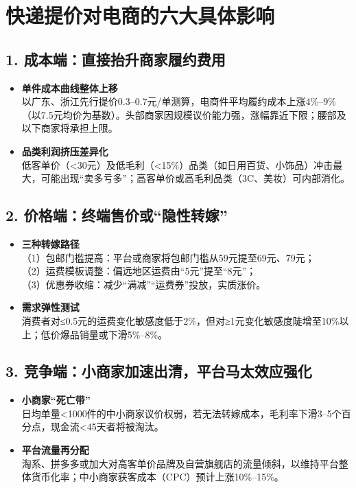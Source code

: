 \section{快递提价对电商的六大具体影响}

\subsection{1. 成本端：直接抬升商家履约费用}
\begin{itemize}
  \item \textbf{单件成本曲线整体上移}  \\
  以广东、浙江先行提价0.3–0.7元/单测算，电商件平均履约成本上涨4\%–9\%（以7.5元均价为基数）。头部商家因规模议价能力强，涨幅靠近下限；腰部及以下商家将承担上限。
  \item \textbf{品类利润挤压差异化}  \\
  低客单价（<30元）及低毛利（<15\%）品类（如日用百货、小饰品）冲击最大，可能出现“卖多亏多”；高客单价或高毛利品类（3C、美妆）可内部消化。
\end{itemize}

\subsection{2. 价格端：终端售价或“隐性转嫁”}
\begin{itemize}
  \item \textbf{三种转嫁路径}  \\
  （1）包邮门槛提高：平台或商家将包邮门槛从59元提至69元、79元；  \\
  （2）运费模板调整：偏远地区运费由“5元”提至“8元”；  \\
  （3）优惠券收缩：减少“满减”“运费券”投放，实质涨价。
  \item \textbf{需求弹性测试}  \\
  消费者对≤0.5元的运费变化敏感度低于2\%，但对≥1元变化敏感度陡增至10\%以上；低价爆品销量或下滑5\%–8\%。
\end{itemize}

\subsection{3. 竞争端：小商家加速出清，平台马太效应强化}
\begin{itemize}
  \item \textbf{小商家“死亡带”}  \\
  日均单量<1000件的中小商家议价权弱，若无法转嫁成本，毛利率下滑3–5个百分点，现金流<45天者将被淘汰。
  \item \textbf{平台流量再分配}  \\
  淘系、拼多多或加大对高客单价品牌及自营旗舰店的流量倾斜，以维持平台整体货币化率；中小商家获客成本（CPC）预计上涨10\%–15\%。
\end{itemize}


